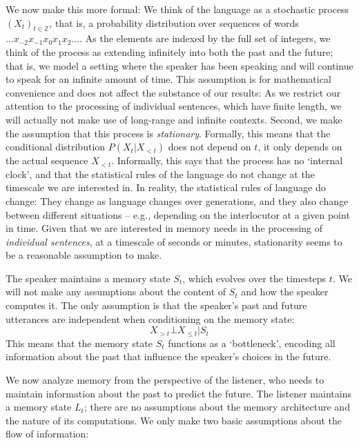 \documentclass[11pt,letterpaper]{article}
\begin{document}
We now make this more formal:
We think of the language as a stochastic process $(X_t)_{t \in \mathbb{Z}}$, that is, a probability distribution over sequences of words $\dots x_{-2} x_{-1} x_0 x_{1} x_{2} \dots$.
As the elements are indexed by the full set of integers, we think of the process as extending infinitely into both the past and the future; that is, we model a setting where the speaker has been speaking and will continue to speak for an infinite amount of time.
This assumption is for mathematical convenience and does not affect the substance of our results: As we restrict our attention to the processing of individual sentences, which have finite length, we will actually not make use of long-range and infinite contexts.
Second, we make the assumption that this process is \emph{stationary}.
Formally, this means that the conditional distribution $P(X_t|X_{<t})$ does not depend on $t$, it only depends on the actual sequence $X_{<t}$.
Informally, this says that the process has no `internal clock', and that the statistical rules of the language do not change at the timescale we are interested in.
In reality, the statistical rules of language do change: They change as language changes over generations, and they also change between different situations -- e.g., depending on the interlocutor at a given point in time.
Given that we are interested in memory needs in the processing of \emph{individual sentences}, at a timescale of seconds or minutes, stationarity seems to be a reasonable assumption to make.


The speaker maintains a memory state $S_t$, which evolves over the timesteps $t$.
We will not make any assumptions about the content of $S_t$ and how the speaker computes it.
The only assumption is that the speaker's past and future utterances are independent when conditioning on the memory state:
\begin{equation}\label{eq:markov-speaker}
X_{>t} \bot X_{\leq t} | S_t
\end{equation}
This means that the memory state $S_t$ functions as a `bottleneck', encoding all information about the past that influence the speaker's choices in the future.


We now analyze memory from the perspective of the listener, who needs to maintain information about the past to predict the future.
The listener maintains a memory state $L_t$; there are no assumptions about the memory architecture and the nature of its computations.
We only make two basic assumptions about the flow of information:
\end{document}
